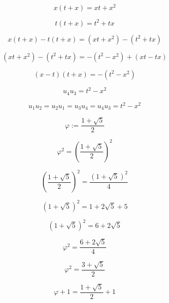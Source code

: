 \documentclass[12pt]{article}
\begin{document}
\begin{equation}
x(t+x)=xt+x^2
\end{equation}

\begin{equation}
t(t+x)=t^2+tx
\end{equation}

\begin{equation}
x(t+x)-t(t+x)=(xt+x^2)-(t^2+tx)
\end{equation}

\begin{equation}
(xt+x^2)-(t^2+tx)=-(t^2-x^2)+(xt-tx)
\end{equation}

\begin{equation}
(x-t)(t+x)=-(t^2-x^2)
\end{equation}

\begin{equation}
u_4u_3=t^2-x^2
\end{equation}

\begin{equation}
u_1u_2=u_2u_1=u_3u_4=u_4u_3=t^2-x^2
\end{equation}

\begin{equation}
\varphi:=\frac{1+\sqrt{5}}{2}
\end{equation}

\begin{equation}
\varphi^2=\left(\frac{1+\sqrt{5}}{2}\right)^{\!2}
\end{equation}

\begin{equation}
\left(\frac{1+\sqrt{5}}{2}\right)^{\!2}=\frac{(1+\sqrt{5})^2}{4}
\end{equation}

\begin{equation}
(1+\sqrt{5})^2=1+2\sqrt{5}+5
\end{equation}

\begin{equation}
(1+\sqrt{5})^2=6+2\sqrt{5}
\end{equation}

\begin{equation}
\varphi^2=\frac{6+2\sqrt{5}}{4}
\end{equation}

\begin{equation}
\varphi^2=\frac{3+\sqrt{5}}{2}
\end{equation}

\begin{equation}
\varphi+1=\frac{1+\sqrt{5}}{2}+1
\end{equation}
\end{document}
